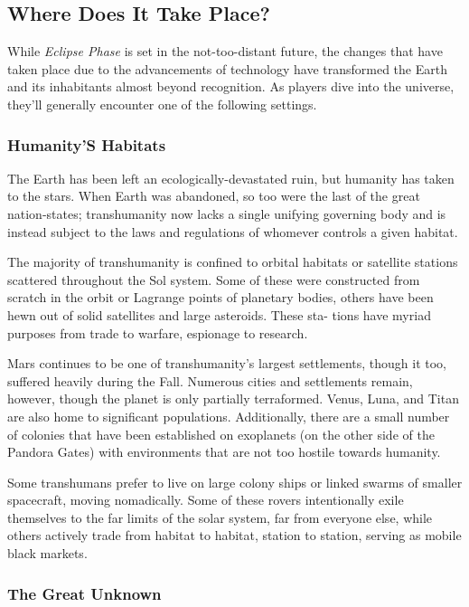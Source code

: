 \subsection{Where Does It Take Place?}

While  \textit{Eclipse Phase} is set in the not-too-distant 
future, the changes that have taken place due to the 
advancements of technology have transformed the 
Earth and its inhabitants almost beyond recognition. 
As players dive into the universe, they'll generally 
encounter one of the following settings.

\subsubsection{Humanity'S Habitats}

The Earth has been left an ecologically-devastated 
ruin, but humanity has taken to the stars. When 
Earth was abandoned, so too were the last of the 
great nation-states; transhumanity now lacks 
a single unifying governing body and is instead 
subject to the laws and regulations of whomever 
controls a given habitat.

The majority of transhumanity is confined to 
orbital habitats or satellite stations scattered 
throughout the Sol system. Some of these were 
constructed from scratch in the orbit or Lagrange 
points of planetary bodies, others have been hewn 
out of solid satellites and large asteroids. These sta-
tions have myriad purposes from trade to warfare, 
espionage to research.

Mars continues to be one of transhumanity's 
largest settlements, though it too, suffered heavily 
during the Fall. Numerous cities and settlements 
remain, however, though the planet is only partially 
terraformed. Venus, Luna, and Titan are also home 
to significant populations. Additionally, there are a 
small number of colonies that have been established 
on exoplanets (on the other side of the Pandora 
Gates) with environments that are not too hostile 
towards humanity.

Some transhumans prefer to live on large colony 
ships or linked swarms of smaller spacecraft, moving 
nomadically. Some of these rovers intentionally exile 
themselves to the far limits of the solar system, far 
from everyone else, while others actively trade from 
habitat to habitat, station to station, serving as 
mobile black markets.

\subsubsection{The Great Unknown}

